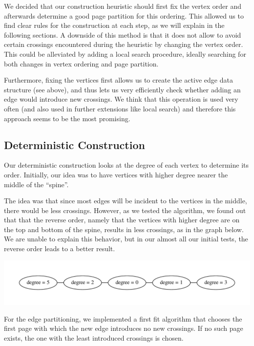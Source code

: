 \documentclass [11pt]{article}
\begin{document}
We decided that our construction heuristic should first fix the vertex order and afterwards determine a good page partition for this ordering. This allowed us to find clear rules for the construction at each step, as we will explain in the following sections. A downside of this method is that it does not allow to avoid certain crossings encountered during the heuristic by changing the vertex order. This could be alleviated by adding a local search procedure, ideally searching for both changes in vertex ordering and page partition. 

Furthermore, fixing the vertices first allows us to create the active edge data structure (see above), and thus lets us very efficiently check whether adding an edge would introduce new crossings. We think that this operation is used very often (and also used in further extensions like local search) and therefore this approach seems to be the most promising.


\subsection{Deterministic Construction}

Our deterministic construction looks at the degree of each vertex to determine its order. Initially, our idea was to have vertices with higher degree nearer the middle of the ``spine''.

The idea was that since most edges will be incident to the vertices in the middle, there would be less crossings. However, as we tested the algorithm, we found out that that the reverse order, namely that the vertices with higher degree are on the top and bottom of the spine, results in less crossings, as in the graph below.
We are unable to explain this behavior, but in our almost all our initial tests, the reverse order leads to a better result. 

\begin{center}
    \includegraphics[scale=0.6]{bilder/graph.pdf}
\end{center}


For the edge partitioning, we implemented a first fit algorithm that chooses the first page with which the new edge introduces no new crossings. If no such page exists, the one with the least introduced crossings is chosen. 
\end{document}
